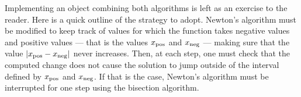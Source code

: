 \documentclass[twoside]{book}
\begin{document}
Implementing an object combining both algorithms is left as an
exercise to the reader. Here is a quick outline of the strategy to
adopt. Newton's algorithm must be modified to keep track of values
for which the function takes negative values and positive values
--- that is the values $x_{\mathop{\rm pos}}$ and $x_{\mathop{\rm neg}}$
--- making sure that the value $\left| x_{\mathop{\rm pos}}-x_{\mathop{\rm neg}}\right|$
never increases. Then, at each step, one must check that the
computed change does not cause the solution to jump outside of the
interval defined by $x_{\mathop{\rm pos}}$ and $x_{\mathop{\rm
neg}}$. If that is the case, Newton's algorithm must be
interrupted for one step using the bisection algorithm.

\ifx\wholebook\relax\else
\end{document}
